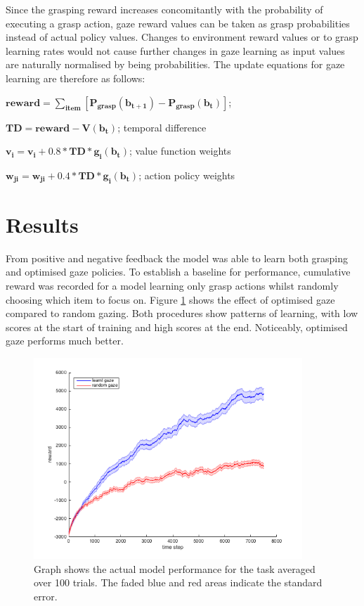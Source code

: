 \documentclass[11]{article}
\begin{document}
Since the grasping reward increases concomitantly with the probability of executing a grasp action, gaze reward values can be taken as grasp probabilities instead of actual policy values. 
Changes to environment reward values or to grasp learning rates would not cause further changes in gaze learning as input values are naturally normalised by being probabilities.
The update equations for gaze learning are therefore as follows: 
\begin{list}{}{}
  \item $\pmb{reward = \sum_{item}[P_{grasp}(b_{t+1}) -  P_{grasp}(b_t)] }$; 
  \item $\pmb{TD = reward - V(b_t)}$; temporal difference
  \item $\pmb{ v_i = v_i + 0.8 * TD * g_i(b_t)}$; value function weights
  \item $\pmb{w_{ji} = w_{ji}+ 0.4 * TD * g_i(b_t)}$; action policy weights
\end{list}  

\section{Results}
From positive and negative feedback the model was able to learn both grasping and optimised gaze policies.
To establish a baseline for performance, cumulative reward was recorded for a model learning only grasp actions whilst randomly choosing which item to focus on.
Figure \ref{fig:results} shows the effect of optimised gaze compared to random gazing. 
Both procedures show patterns of learning, with low scores at the start of training and high scores at the end.   
Noticeably, optimised gaze performs much better.

\begin{figure}[!h]
	\centering
	\includegraphics[width=0.9\textwidth]{figures/results.png}
	\caption{Graph shows the actual model performance for the task averaged over 100 trials. The faded blue and red areas indicate the standard error.}
	\label{fig:results}
\end{figure}
\end{document}
